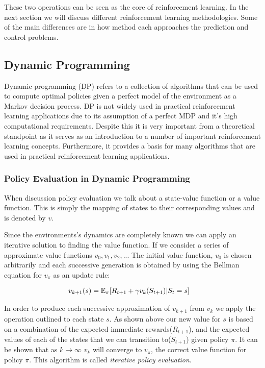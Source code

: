 These two operations can be seen as the core of reinforcement learning.
In the next section we will discuss different reinforcement learning methodologies.
Some of the main differences are in how method each approaches the prediction and control problems.

\subsection{Dynamic Programming}\label{subsec:dp}
Dynamic programming (DP) refers to a collection of algorithms that can be used to compute optimal policies given a
perfect model of the environment as a Markov decision process\citep{sutton1998reinforcement}.
DP is not widely used in practical reinforcement learning applications due to its assumption
of a perfect MDP and it's high computational requirements.
Despite this it is very important from a theoretical standpoint as it serves as an introduction to a number
of important reinforcement learning concepts.
Furthermore, it provides a basis for many algorithms that are used in practical reinforcement learning applications.

\subsubsection{Policy Evaluation in Dynamic Programming}
When discussion policy evaluation we talk about a state-value function or a value function.
This is simply the mapping of states to their corresponding values and is denoted by $v$.

Since the environments's dynamics are completely known we can apply an iterative solution to finding
the value function.
If we consider a series of approximate value functions $v_0, v_1, v_2,..$.
The initial value function, $v_0$ is chosen arbitrarily and each successive generation is obtained by
using the Bellman equation for $v_\pi$ as an update rule\citep{sutton1998reinforcement}:

\begin{align}
    v_{k+1}(s) &= \operatorname{\mathbb{E}}_{\pi}\lbrack R_{t+1} + \gamma v_k(S_{t+1}) | S_t = s \rbrack
\end{align}

In order to produce each successive approximation of $v_{k+1}$ from $v_k$ we apply the operation outlined to each
state $s$.
As shown above our new value for $s$ is based on a combination of the expected immediate rewards($R_{t+1}$),
and the expected values of each of the states that we can transition to($S_{t+1}$) given policy $\pi$.
It can be shown that as $k\rightarrow\infty$ $v_k$ will converge to $v_\pi$, the correct value function for policy
$\pi$.
This algorithm is called \textit{iterative policy evaluation}\citep{sutton1998reinforcement}.


